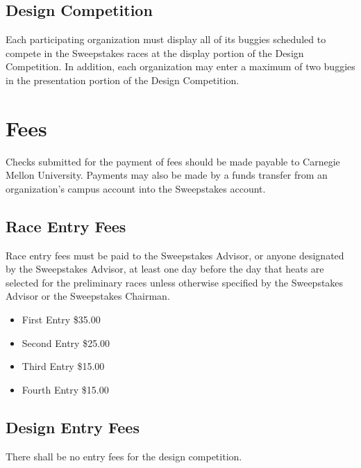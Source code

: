 \subsection{Design Competition}

	Each participating organization must display all of its buggies scheduled to
	compete in the Sweepstakes races at the display portion of the Design
	Competition. In addition, each organization may enter a maximum of two buggies
	in the presentation portion of the Design Competition.

\section{Fees}

	Checks submitted for the payment of fees should be made payable to Carnegie
	Mellon University. Payments may also be made by a funds transfer from an
	organization's campus account into the Sweepstakes account.

\subsection{Race Entry Fees}

	Race entry fees must be paid to the Sweepstakes Advisor, or anyone designated
	by the Sweepstakes Advisor, at least one day before the day that heats are
	selected for the preliminary races unless otherwise specified by the Sweepstakes Advisor 
	or the Sweepstakes Chairman.

	\begin{itemize}
		\item First Entry \$35.00
		\item Second Entry \$25.00
		\item Third Entry \$15.00
		\item Fourth Entry \$15.00
	\end{itemize}

\subsection{Design Entry Fees}

	There shall be no entry fees for the design competition.


